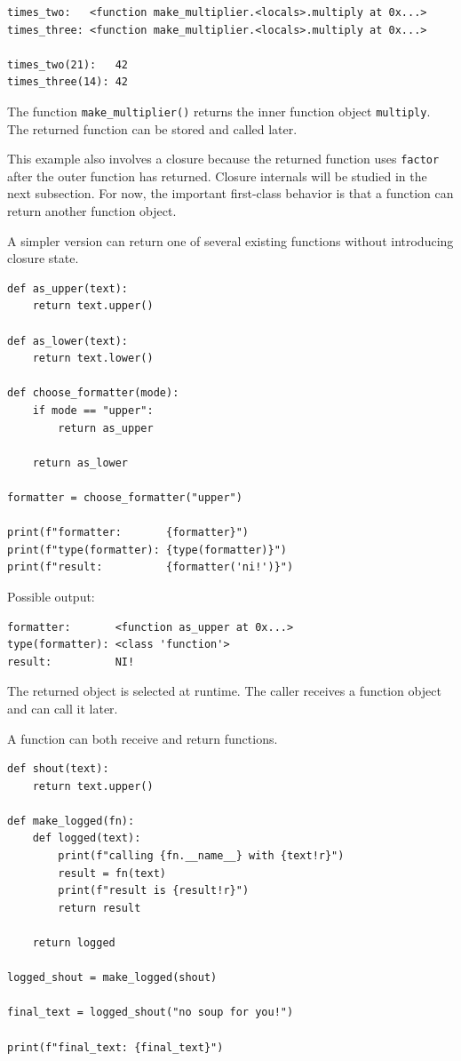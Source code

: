 \begin{verbatim}
times_two:   <function make_multiplier.<locals>.multiply at 0x...>
times_three: <function make_multiplier.<locals>.multiply at 0x...>

times_two(21):   42
times_three(14): 42
\end{verbatim}

The function \texttt{make\_multiplier()} returns the inner function object \texttt{multiply}. The returned function can be stored and called later.

This example also involves a closure because the returned function uses \texttt{factor} after the outer function has returned. Closure internals will be studied in the next subsection. For now, the important first-class behavior is that a function can return another function object.

A simpler version can return one of several existing functions without introducing closure state.

\begin{verbatim}
def as_upper(text):
    return text.upper()

def as_lower(text):
    return text.lower()

def choose_formatter(mode):
    if mode == "upper":
        return as_upper

    return as_lower

formatter = choose_formatter("upper")

print(f"formatter:       {formatter}")
print(f"type(formatter): {type(formatter)}")
print(f"result:          {formatter('ni!')}")
\end{verbatim}

Possible output:

\begin{verbatim}
formatter:       <function as_upper at 0x...>
type(formatter): <class 'function'>
result:          NI!
\end{verbatim}

The returned object is selected at runtime. The caller receives a function object and can call it later.

A function can both receive and return functions.

\begin{verbatim}
def shout(text):
    return text.upper()

def make_logged(fn):
    def logged(text):
        print(f"calling {fn.__name__} with {text!r}")
        result = fn(text)
        print(f"result is {result!r}")
        return result

    return logged

logged_shout = make_logged(shout)

final_text = logged_shout("no soup for you!")

print(f"final_text: {final_text}")
\end{verbatim}

